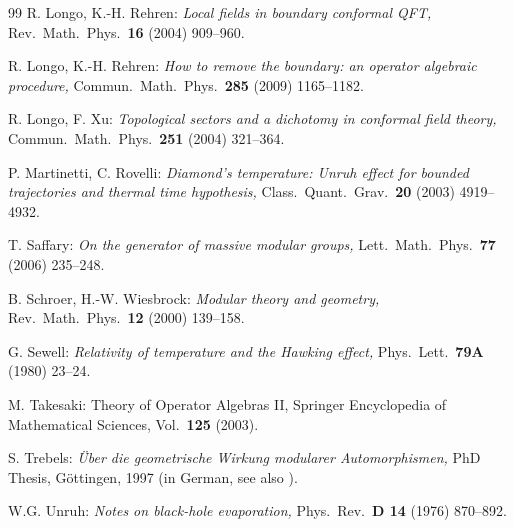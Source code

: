 \documentclass[12pt]{article}
\begin{document}
\begin{thebibliography}{99}
 R. Longo, K.-H. Rehren:  
 {\it Local fields in boundary conformal QFT,}  
 Rev.\ Math.\ Phys.\ {\bf 16} (2004) 909--960.

 R. Longo, K.-H. Rehren:  
 {\it How to remove the boundary: an operator algebraic procedure,}  
 Commun.\ Math.\ Phys.\ {\bf 285} (2009) 1165--1182.

 R. Longo, F. Xu:
 {\it Topological sectors and a dichotomy in conformal field theory,}
 Commun.\ Math.\ Phys.\  {\bf 251} (2004) 321--364.

 P. Martinetti, C. Rovelli: 
 {\it Diamond's temperature: Unruh effect for bounded trajectories and
 thermal time hypothesis,} 
 Class.\ Quant.\ Grav.\  {\bf 20} (2003) 4919--4932.

 T. Saffary: 
 {\it On the generator of massive modular groups,}
 Lett.\ Math.\ Phys.\ {\bf 77} (2006) 235--248.

 B. Schroer, H.-W. Wiesbrock: 
 {\it Modular theory and geometry,}
 Rev.\ Math.\ Phys.\  {\bf 12} (2000) 139--158.

 G. Sewell:
{\it Relativity of temperature and the Hawking effect,}
 Phys.\ Lett.\ {\bf 79A} (1980) 23--24.

 M. Takesaki:
 {Theory of Operator Algebras II}, Springer Encyclopedia of
Mathematical Sciences, Vol.\ {\bf 125} (2003). 
 
 S. Trebels: 
 {\it Über die geometrische Wirkung modularer Automorphismen,}
 PhD Thesis, Göttingen, 1997 (in German, see also \cite{Bo}).

 W.G. Unruh:
 {\it Notes on black-hole evaporation,}
 Phys.\ Rev.\ {\bf D 14} (1976) 870--892.





\end{thebibliography}
\end{document}
